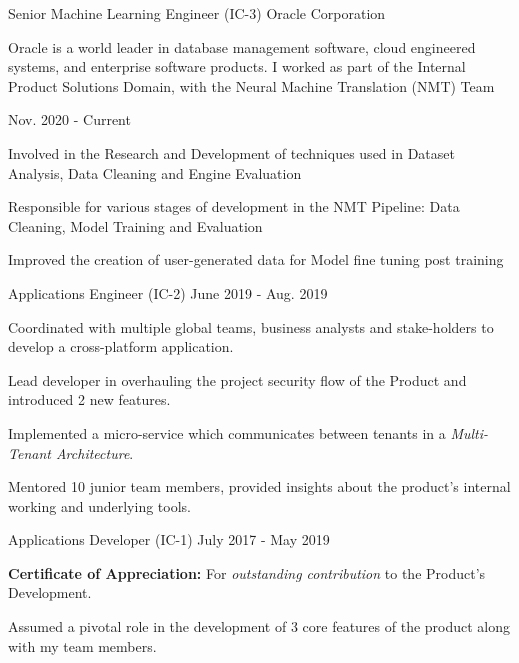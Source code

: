 \begin{cventries}
  \cvexperience
    {Senior Machine Learning Engineer (IC-3)}
    {Oracle Corporation}
    {}
    {
    \begin{cvitems}
    \hspace{-2ex}
        Oracle is a world leader in database management software, cloud engineered systems, and enterprise software products. I worked as part of the Internal Product Solutions Domain, with the Neural Machine Translation (NMT) Team
    \end{cvitems}
    \vspace{-2ex}
    }
    {Nov. 2020 - Current}
    {
      \begin{cvitems}
        \item {Involved in the Research and Development of techniques used in Dataset Analysis, Data Cleaning and Engine Evaluation}
        \item {Responsible for various stages of development in the NMT Pipeline: Data Cleaning, Model Training and Evaluation}
        \item {Improved the creation of user-generated data for Model fine tuning post training}
      \end{cvitems}
    }
  \cvexperiencecontinued
    {Applications Engineer (IC-2)}
    {}
    {June 2019 - Aug. 2019}
    {
      \begin{cvitems}
        \item {Coordinated with multiple global teams, business analysts and stake-holders to develop a cross-platform application.}
        \item {Lead developer in overhauling the project security flow of the Product and introduced 2 new features.}
        \item {Implemented a micro-service which communicates between tenants in a \textit{Multi-Tenant Architecture}.}
        \item {Mentored 10 junior team members, provided insights about the product's internal working and underlying tools.}
      \end{cvitems}
    }
  \cvexperiencecontinued
    {Applications Developer (IC-1)}
    {}
    {July 2017 - May 2019}
    {
      \begin{cvitems}
        \item {\textbf{Certificate of Appreciation:} For \textit{outstanding contribution} to the Product's Development.}
        \item {Assumed a pivotal role in the development of 3 core features of the product along with my team members.}

\end{cvitems}}
\end{cventries}
